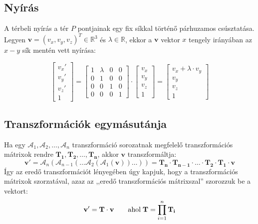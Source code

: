 \subsection{Nyírás}

A térbeli nyírás a tér $P$ pontjainak egy fix síkkal történő párhuzamos csúsztatása. Legyen $\mathbf{v}=(v_x, v_y, v_z)^T\in\mathbb{R}^3$ és $\lambda\in\mathbb{R}$, ekkor a $\mathbf{v}$ vektor $x$ tengely irányában az $x-y$ sík mentén vett nyírása:

\[\left[\begin{array}{c}v_x' \\v_y' \\v_z' \\ 1 \end{array}\right] = \left[\begin{array}{cccc}1 & \lambda & 0 & 0\\0 & 1 & 0 & 0\\ 0 & 0 & 1 & 0\\ 0 & 0 & 0 & 1\end{array}\right] \cdot \left[\begin{array}{c}v_x\\ v_y\\ v_z\\ 1\end{array}\right] = \left[\begin{array}{c}v_x + \lambda\cdot v_y\\ v_y\\ v_z\\ 1\end{array}\right]\]

\subsection{Transzformációk egymásutánja}

Ha egy $\mathcal{A}_1, \mathcal{A}_2, \ldots, \mathcal{A}_n$ transzformáció sorozatnak megfelelő transzformációs mátrixok rendre $\mathbf{T_1}, \mathbf{T_2}, \ldots, \mathbf{T_n}$, akkor $\mathbf{v}$ transzformáltja:
\[\mathbf{v}' = \mathcal{A}_n(\mathcal{A}_{n-1}(\ldots \mathcal{A}_2(\mathcal{A}_1(\mathbf{v}))\ldots)) = \mathbf{T_n} \cdot \mathbf{T_{n-1}} \cdot \ldots \cdot \mathbf{T_2} \cdot \mathbf{T_1} \cdot \mathbf{v}\]
Így az eredő transzformációt lényegében úgy kapjuk, hogy a transzformációs mátrixok szorzatával, azaz az ,,eredő transzformációs mátrixszal'' szorozzuk be a vektort:
\[\mathbf{v}' = \mathbf{T} \cdot \mathbf{v} \qquad \hbox{ahol} \; \mathbf{T} = \prod_{i=1}^{n}{\mathbf{T_i}}\]

